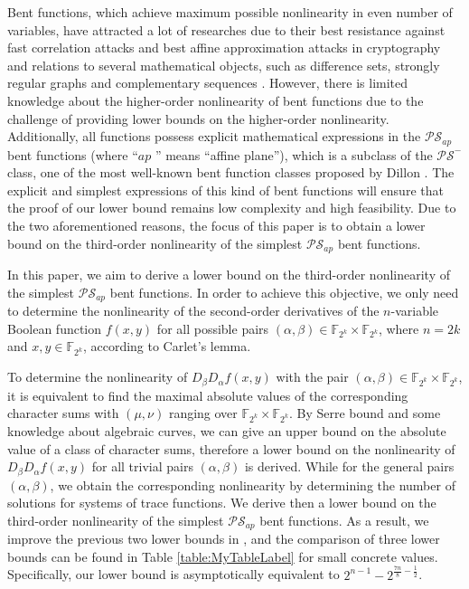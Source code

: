 \documentclass[preprint,10pt]{elsarticle}
\newcommand{\F}{\mathbb{F}}
\newcommand{\0}{\textbf{0}}
\newcommand{\1}{\textbf{1}}
\theoremstyle{plain}
\begin{document}
    Bent functions, which achieve maximum possible nonlinearity in even number of variables,
    have attracted a lot of researches due to their best resistance against fast correlation attacks \cite{MS1988fast_correlation_attack} and best affine approximation attacks \cite{DingXS1991book} in cryptography and relations to several mathematical objects, such as difference sets, strongly regular graphs and complementary sequences \cite{Carlet2020book}.
    However, there is limited knowledge about the higher-order nonlinearity of bent functions due to the challenge of providing lower bounds on the higher-order nonlinearity.
    Additionally, all functions possess explicit mathematical expressions in the $\mathcal{PS}_{ap}$ bent functions (where ``$ap$ '' means ``affine plane''), which is a subclass of the $\mathcal{PS}^-$ class, one of the most well-known bent function classes proposed by Dillon \cite{Dillon1974PSbent}.
    The explicit and simplest expressions of this kind of bent functions will ensure that the proof of our lower bound remains low complexity and high feasibility.
    Due to the two aforementioned reasons,
    the focus of this paper is to obtain a lower bound on the third-order nonlinearity of the simplest $\mathcal{PS}_{ap}$ bent functions.

    In this paper, we aim to derive a lower bound on the third-order nonlinearity of the simplest $\mathcal{PS}_{ap}$ bent functions.
    In order to achieve this objective, we only need to determine the nonlinearity of the second-order derivatives of the $n$-variable Boolean function $f(x,y)$ for all possible pairs $(\alpha,\beta)\in\F_{2^k}\times\F_{2^k}$, where $n=2k$ and $x,y\in\F_{2^k}$, according to Carlet's lemma.
    
    To determine the nonlinearity of $D_{\beta}D_{\alpha}f(x,y)$ with the pair $(\alpha,\beta)\in\F_{2^k}\times\F_{2^k}$, it is equivalent to find the maximal absolute values of the corresponding character sums with $(\mu,\nu)$ ranging over $\F_{2^k}\times\F_{2^k}$.
    By Serre bound and some knowledge about algebraic curves, we can give an upper bound on the absolute value of a class of character sums, therefore a lower bound on the nonlinearity of $D_{\beta}D_{\alpha}f(x,y)$ for all trivial pairs $(\alpha,\beta)$ is  derived.
    While for the general pairs $(\alpha,\beta)$, we obtain the corresponding nonlinearity by determining the number of solutions for systems of trace functions.
    We derive then a lower bound on the third-order nonlinearity of the simplest $\mathcal{PS}_{ap}$ bent functions.
    As a result,
    we improve the previous two lower bounds in \cite{Carlet2011NL_Profile_Dillon,TangCT2013NL_2bent}, and the comparison of three lower bounds can be found in Table \ref{table:MyTableLabel} for small concrete values.
    Specifically, our lower bound is asymptotically equivalent to $2^{n-1}-2^{\frac{7n}{8}-\frac{1}{2}}$.
\end{document}
